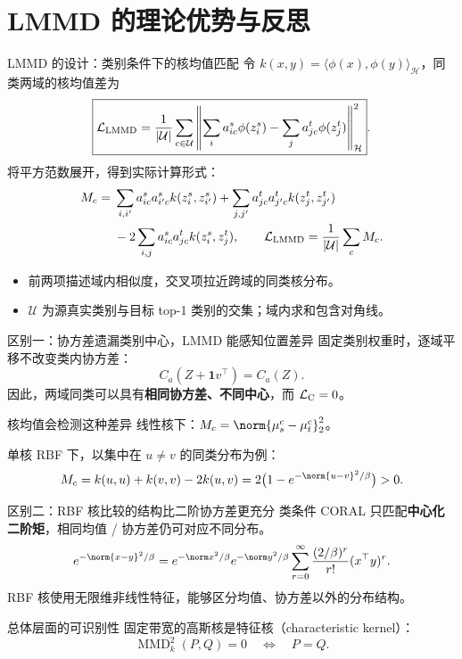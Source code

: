 \section{LMMD 的理论优势与反思}

\begin{frame}[t]{LMMD 的设计：类别条件下的核均值匹配}
\small
令 $k(x,y)=\langle\phi(x),\phi(y)\rangle_{\mathcal H}$，同类两域的核均值差为
\[
\boxed{\mathcal L_{\mathrm{LMMD}}=\frac1{|\mathcal U|}\sum_{c\in\mathcal U}
\left\|\sum_i a^s_{ic}\phi(z_i^s)-\sum_j a^t_{jc}\phi(z_j^t)\right\|_{\mathcal H}^2}.
\]
将平方范数展开，得到实际计算形式：
\[
\begin{aligned}
M_c={}&\sum_{i,i'}a^s_{ic}a^s_{i'c}k(z_i^s,z_{i'}^s)
+\sum_{j,j'}a^t_{jc}a^t_{j'c}k(z_j^t,z_{j'}^t)\\
&-2\sum_{i,j}a^s_{ic}a^t_{jc}k(z_i^s,z_j^t),\qquad
\mathcal L_{\mathrm{LMMD}}=\frac1{|\mathcal U|}\sum_cM_c.
\end{aligned}
\]
\begin{itemize}
  \item 前两项描述域内相似度，交叉项拉近跨域的同类核分布。
  \item $\mathcal U$ 为源真实类别与目标 top-1 类别的交集；域内求和包含对角线。
\end{itemize}
\end{frame}

\begin{frame}[t]{区别一：协方差遗漏类别中心，LMMD 能感知位置差异}
\small
固定类别权重时，逐域平移不改变类内协方差：
\[
C_a(Z+\mathbf1v^\top)=C_a(Z).
\]
因此，两域同类可以具有\textbf{相同协方差、不同中心}，而 $\mathcal L_{\mathrm{C}}=0$。
\vspace{2mm}
\begin{block}{核均值会检测这种差异}
线性核下：$M_c=\norm{\mu_s^c-\mu_t^c}_2^2$。\par\vspace{2mm}
单核 RBF 下，以集中在 $u\ne v$ 的同类分布为例：
\[
M_c=k(u,u)+k(v,v)-2k(u,v)
=2\bigl(1-e^{-\norm{u-v}^2/\beta}\bigr)>0.
\]
\end{block}
\end{frame}

\begin{frame}[t]{区别二：RBF 核比较的结构比二阶协方差更充分}
\small
类条件 CORAL 只匹配\textbf{中心化二阶矩}，相同均值 / 协方差仍可对应不同分布。
\[
e^{-\norm{x-y}^2/\beta}
=e^{-\norm x^2/\beta}e^{-\norm y^2/\beta}
\sum_{r=0}^{\infty}\frac{(2/\beta)^r}{r!}(x^\top y)^r.
\]
RBF 核使用无限维非线性特征，能够区分均值、协方差以外的分布结构。
\begin{block}{总体层面的可识别性}
固定带宽的高斯核是特征核（characteristic kernel）：
\[
\operatorname{MMD}_k^2(P,Q)=0\quad\Longleftrightarrow\quad P=Q.
\]
\end{block}
\end{frame}

